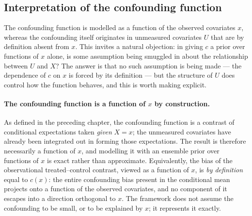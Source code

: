 \subsection{Interpretation of the confounding function}
\label{subsec:c-interpret}

The confounding function is modelled as a function of the observed covariates
$x$, whereas the confounding itself originates in unmeasured covariates $U$ that
are by definition absent from $x$. This invites a natural objection: in giving
$c$ a prior over functions of $x$ alone, is some assumption being smuggled in
about the relationship between $U$ and $X$? The answer is that no such
assumption is being made --- the dependence of $c$ on $x$ is forced by its
definition --- but the structure of $U$ does control how the function behaves,
and this is worth making explicit.

\paragraph{The confounding function is a function of $x$ by construction.}
As defined in the preceding chapter, the confounding function is a contrast of
conditional expectations taken \emph{given} $X = x$; the unmeasured covariates
have already been integrated out in forming those expectations. The result is
therefore necessarily a function of $x$, and modelling it with an ensemble prior
over functions of $x$ is exact rather than approximate. Equivalently, the bias
of the observational treated--control contrast, viewed as a function of $x$, is
\emph{by definition} equal to $c(x)$: the entire confounding bias present in the
conditional mean projects onto a function of the observed covariates, and no
component of it escapes into a direction orthogonal to $x$. The framework does
not assume the confounding to be small, or to be explained by $x$; it represents
it exactly.

